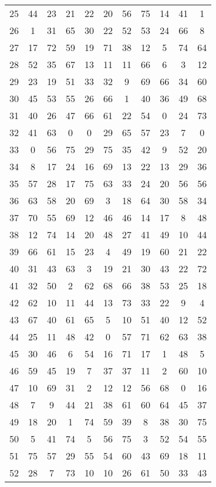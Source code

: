 \begin{table}
\begin{tabular}{c c c c c c c c c c c }
25 & 44 & 23 & 21 & 22 & 20 & 56 & 75 & 14 & 41 & 1 \\
26 & 1 & 31 & 65 & 30 & 22 & 52 & 53 & 24 & 66 & 8 \\
27 & 17 & 72 & 59 & 19 & 71 & 38 & 12 & 5 & 74 & 64 \\
28 & 52 & 35 & 67 & 13 & 11 & 11 & 66 & 6 & 3 & 12 \\
29 & 23 & 19 & 51 & 33 & 32 & 9 & 69 & 66 & 34 & 60 \\
30 & 45 & 53 & 55 & 26 & 66 & 1 & 40 & 36 & 49 & 68 \\
31 & 40 & 26 & 47 & 66 & 61 & 22 & 54 & 0 & 24 & 73 \\
32 & 41 & 63 & 0 & 0 & 29 & 65 & 57 & 23 & 7 & 0 \\
33 & 0 & 56 & 75 & 29 & 75 & 35 & 42 & 9 & 52 & 20 \\
34 & 8 & 17 & 24 & 16 & 69 & 13 & 22 & 13 & 29 & 36 \\
35 & 57 & 28 & 17 & 75 & 63 & 33 & 24 & 20 & 56 & 56 \\
36 & 63 & 58 & 20 & 69 & 3 & 18 & 64 & 30 & 58 & 34 \\
37 & 70 & 55 & 69 & 12 & 46 & 46 & 14 & 17 & 8 & 48 \\
38 & 12 & 74 & 14 & 20 & 48 & 27 & 41 & 49 & 10 & 44 \\
39 & 66 & 61 & 15 & 23 & 4 & 49 & 19 & 60 & 21 & 22 \\
40 & 31 & 43 & 63 & 3 & 19 & 21 & 30 & 43 & 22 & 72 \\
41 & 32 & 50 & 2 & 62 & 68 & 66 & 38 & 53 & 25 & 18 \\
42 & 62 & 10 & 11 & 44 & 13 & 73 & 33 & 22 & 9 & 4 \\
43 & 67 & 40 & 61 & 65 & 5 & 10 & 51 & 40 & 12 & 52 \\
44 & 25 & 11 & 48 & 42 & 0 & 57 & 71 & 62 & 63 & 38 \\
45 & 30 & 46 & 6 & 54 & 16 & 71 & 17 & 1 & 48 & 5 \\
46 & 59 & 45 & 19 & 7 & 37 & 37 & 11 & 2 & 60 & 10 \\
47 & 10 & 69 & 31 & 2 & 12 & 12 & 56 & 68 & 0 & 16 \\
48 & 7 & 9 & 44 & 21 & 38 & 61 & 60 & 64 & 45 & 37 \\
49 & 18 & 20 & 1 & 74 & 59 & 39 & 8 & 38 & 30 & 75 \\
50 & 5 & 41 & 74 & 5 & 56 & 75 & 3 & 52 & 54 & 55 \\
51 & 75 & 57 & 29 & 55 & 54 & 60 & 43 & 69 & 18 & 11 \\
52 & 28 & 7 & 73 & 10 & 10 & 26 & 61 & 50 & 33 & 43 \\

\end{tabular}
\end{table}
